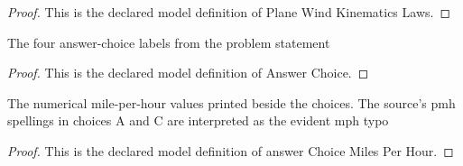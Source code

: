 \begin{proof}
  This is the declared model definition of Plane Wind Kinematics Laws.
\end{proof}
\begin{definition}
  \label{def:physics:phyx-mini-0828:phyxminiproblems-problemphyxmini0828-answerchoice}
  The four answer-choice labels from the problem statement
\end{definition}
\begin{proof}
  This is the declared model definition of Answer Choice.
\end{proof}
\begin{definition}
  \label{def:physics:phyx-mini-0828:phyxminiproblems-problemphyxmini0828-answerchoicemilesperhour}
  The numerical mile-per-hour values printed beside the choices. The source's pmh spellings in choices A and C are interpreted as the evident mph typo
\end{definition}
\begin{proof}
  This is the declared model definition of answer Choice Miles Per Hour.
\end{proof}
